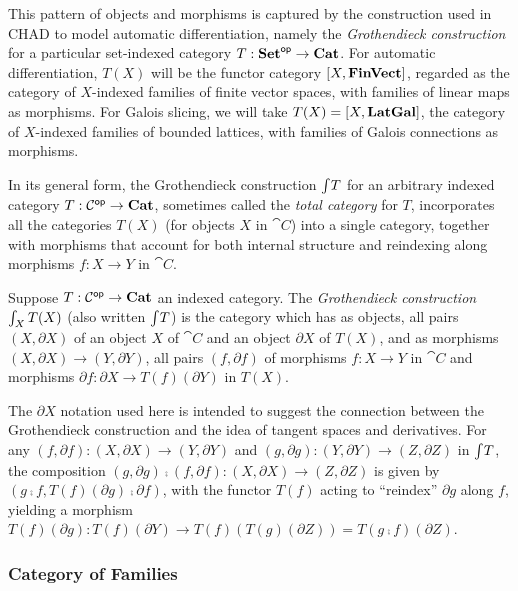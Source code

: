 This pattern of objects and morphisms is captured by the construction used in CHAD to model automatic
differentiation, namely the \emph{Grothendieck construction} for a particular set-indexed category $T:
\mathbf{Set}^{\mathsf{op}} \to \mathbf{Cat}$. For automatic differentiation, $T(X)$ will be the functor category $[X,\mathbf{FinVect}]$,
regarded as the category of $X$-indexed families of finite vector spaces, with families of linear maps as
morphisms. For Galois slicing, we will take $T(X) = [X,\mathbf{LatGal}]$, the category of $X$-indexed families
of bounded lattices, with families of Galois connections as morphisms.

In its general form, the Grothendieck construction $\int_{}T$ for an arbitrary indexed category $T:
\mathcal{C}^{\mathsf{op}} \to \mathbf{Cat}$, sometimes called the \emph{total category} for $T$, incorporates all the categories
$T(X)$ (for objects $X$ in $\cat{C}$) into a single category, together with morphisms that account for both
internal structure and reindexing along morphisms $f: X \to Y$ in $\cat{C}$.

\begin{definition}
\label{def:Grothendieck}
Suppose $T: \mathcal{C}^{\mathsf{op}} \to \mathbf{Cat}$ an indexed category. The \emph{Grothendieck construction}
$\int_{X}T(X)$ (also written $\int_{}T$) is the category which has as objects, all pairs $(X,
\partial X)$ of an object $X$ of $\cat{C}$ and an object $\partial X$ of $T(X)$, and as morphisms $(X,
\partial X) \to (Y, \partial Y)$, all pairs $(f, \partial f)$ of morphisms $f: X \to Y$ in $\cat{C}$ and
morphisms $\partial f: \partial X \to T(f)(\partial Y)$ in $T(X)$.
\end{definition}

\noindent The $\partial X$ notation used here is intended to suggest the connection between the Grothendieck
construction and the idea of tangent spaces and derivatives. For any $(f, \partial f): (X, \partial X) \to (Y,
\partial Y)$ and $(g, \partial g): (Y, \partial Y) \to (Z, \partial Z)$ in $\int_{}T$, the composition
$(g, \partial g) \comp (f, \partial f): (X, \partial X) \to (Z, \partial Z)$ is given by $(g \comp f,
T(f)(\partial g) \comp \partial f)$, with the functor $T(f)$ acting to ``reindex'' $\partial g$ along $f$,
yielding a morphism $T(f)(\partial g): T(f)(\partial Y) \to T(f)(T(g)(\partial Z)) = T(g \comp f)(\partial
Z)$.


\subsubsection{Category of Families}
\label{sec:Fam}

